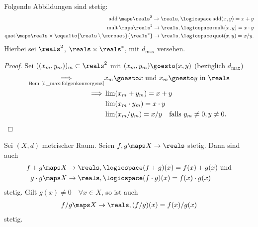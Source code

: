 \begin{lemma}\label{d_max:operationen_stetig}
    Folgende Abbildungen sind stetig:
    \begin{align*}
        \operatorname{add}\maps \reals^2\to \reals,\logicspace \operatorname{add}(x,y)=x+y\\
        \operatorname{mult}\maps \reals^2\to \reals,\logicspace \operatorname{mult}(x,y)=x\cdot y\\
        \operatorname{quot}\maps \reals \times\equalto{\reals \setminus\zeroset}{\reals^{*}}\to \reals,\logicspace \operatorname{quot}(x,y)=x/y.
    \end{align*}
    Hierbei sei \( \reals^2\), \( \reals \times\reals^{*}\), mit \( d_{\max}\) versehen.
\end{lemma}
\begin{proof}
    Sei \( ((x_m,y_m))_m\subset \reals^2\) mit \( (x_m,y_m)\goesto (x,y)\) (bezüglich \( d_{\max}\))
    \begin{align*}
        \underset{\text{Bem~\ref{d_max:folgenkonvergenz}}}{\implies} &x_m\goesto x\text{ und }x_m\goesto y\text{ in }\reals \\
        \implies& \lim (x_m+y_m)=x+y\\
        &\lim (x_m\cdot y_m)=x\cdot y\\
        &\lim (x_m/y_m)=x/y\quad \text{falls }y_m \neq 0,y\neq 0.
    \end{align*}
    
\end{proof}
\begin{folgerung*}
    Sei \( (X,d)\) metrischer Raum. Seien \( f,g\maps X\to \reals \) stetig. Dann sind auch
    \begin{align*}
        f+g&\maps X\to \reals,\logicspace  (f+g)(x)=f(x)+g(x) \text{ und}\\
        g\cdot g&\maps X\to \reals,\logicspace (f\cdot g)(x)=f(x)\cdot g(x)
    \end{align*}
    stetig. Gilt \( g(x)\neq 0 \quad \forall x\in X\), so ist auch
    \begin{align*}
        f/g\maps X\to \reals, (f/g)(x)=f(x)/g(x)
    \end{align*}
    stetig.
\end{folgerung*}
